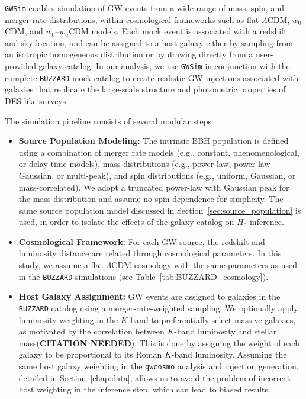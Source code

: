\texttt{\texttt{GWSim}} enables simulation of GW events from a wide range of mass, spin, and merger rate distributions, within cosmological frameworks such as flat $\Lambda$CDM, $w_0$CDM, and $w_0\text{--}w_a$CDM models. Each mock event is associated with a redshift and sky location, and can be assigned to a host galaxy either by sampling from an isotropic homogeneous distribution or by drawing directly from a user-provided galaxy catalog. In our analysis, we use \texttt{\texttt{GWSim}} in conjunction with the complete \texttt{BUZZARD} mock catalog to create realistic \ac{GW} injections associated with galaxies that replicate the large-scale structure and photometric properties of \ac{DES}-like surveys.

The simulation pipeline consists of several modular steps:

\begin{itemize}
    \item \textbf{Source Population Modeling:} The intrinsic \ac{BBH} population is defined using a combination of merger rate models (e.g., constant, phenomenological, or delay-time models), mass distributions (e.g., power-law, power-law + Gaussian, or multi-peak), and spin distributions (e.g., uniform, Gaussian, or mass-correlated). We adopt a truncated power-law with Gaussian peak for the mass distribution and assume no spin dependence for simplicity. The same source population model discussed in Section~\ref{sec:source_population} is used, in order to isolate the effects of the galaxy catalog on $H_0$ inference.

    \item \textbf{Cosmological Framework:} For each GW source, the redshift and luminosity distance are related through cosmological parameters. In this study, we assume a flat $\Lambda$CDM cosmology with the same parameters as used in the \texttt{BUZZARD} simulations (see Table~\ref{tab:BUZZARD_cosmology}).

    \item \textbf{Host Galaxy Assignment:} \ac{GW} events are assigned to galaxies in the \texttt{BUZZARD} catalog using a merger-rate-weighted sampling. We optionally apply luminosity weighting in the $K$-band to preferentially select massive galaxies, as motivated by the correlation between $K$-band luminosity and stellar mass(\textbf{CITATION NEEDED}). This is done by assigning the weight of each galaxy to be proportional to its Roman $K$-band luminosity. Assuming the same host galaxy weighting in the \texttt{gwcosmo} analysis and injection generation, detailed in Section~\ref{chap:data}, allows us to avoid the problem of incorrect host weighting in the inference step, which can lead to biased results. 


\end{itemize}
